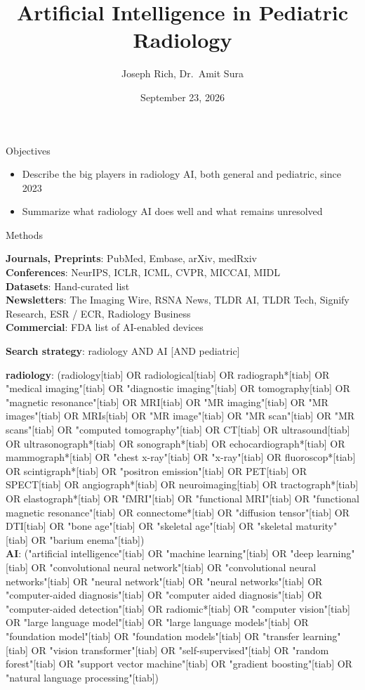 \documentclass[aspectratio=169]{beamer}
\title[Radiology AI]{Artificial Intelligence in Pediatric Radiology}
\author{Joseph Rich, Dr.~Amit Sura}
\date{September 23, 2026}
\begin{document}
\frame{\titlepage}

\begin{frame}{Objectives}
\begin{itemize}
  \item Describe the big players in radiology AI, both general and pediatric, since 2023
  \item Summarize what radiology AI does well and what remains unresolved
\end{itemize}
\end{frame}

\begin{frame}{Methods}
\vspace{-4pt}
{\small
\textbf{Journals, Preprints}: PubMed, Embase, arXiv, medRxiv\\
\textbf{Conferences}: NeurIPS, ICLR, ICML, CVPR, MICCAI, MIDL\\
\textbf{Datasets}: Hand-curated list\\
\textbf{Newsletters}: The Imaging Wire, RSNA News, TLDR AI, TLDR Tech, Signify Research, ESR / ECR, Radiology Business\\
\textbf{Commercial}: FDA list of AI-enabled devices\par}
\vspace{2pt}
{\small\textbf{Search strategy}: radiology AND AI [AND pediatric]\par}
\vspace{2pt}
{\tiny\fontsize{6}{7.3}\selectfont\raggedright
\textbf{radiology}: (radiology[tiab] OR radiological[tiab] OR radiograph*[tiab] OR "medical imaging"[tiab] OR "diagnostic imaging"[tiab] OR tomography[tiab] OR "magnetic resonance"[tiab] OR MRI[tiab] OR "MR imaging"[tiab] OR "MR images"[tiab] OR MRIs[tiab] OR "MR image"[tiab] OR "MR scan"[tiab] OR "MR scans"[tiab] OR "computed tomography"[tiab] OR CT[tiab] OR ultrasound[tiab] OR ultrasonograph*[tiab] OR sonograph*[tiab] OR echocardiograph*[tiab] OR mammograph*[tiab] OR "chest x-ray"[tiab] OR "x-ray"[tiab] OR fluoroscop*[tiab] OR scintigraph*[tiab] OR "positron emission"[tiab] OR PET[tiab] OR SPECT[tiab] OR angiograph*[tiab] OR neuroimaging[tiab] OR tractograph*[tiab] OR elastograph*[tiab] OR "fMRI"[tiab] OR "functional MRI"[tiab] OR "functional magnetic resonance"[tiab] OR connectome*[tiab] OR "diffusion tensor"[tiab] OR DTI[tiab] OR "bone age"[tiab] OR "skeletal age"[tiab] OR "skeletal maturity"[tiab] OR "barium enema"[tiab])\\[2pt]
\textbf{AI}: ("artificial intelligence"[tiab] OR "machine learning"[tiab] OR "deep learning"[tiab] OR "convolutional neural network"[tiab] OR "convolutional neural networks"[tiab] OR "neural network"[tiab] OR "neural networks"[tiab] OR "computer-aided diagnosis"[tiab] OR "computer aided diagnosis"[tiab] OR "computer-aided detection"[tiab] OR radiomic*[tiab] OR "computer vision"[tiab] OR "large language model"[tiab] OR "large language models"[tiab] OR "foundation model"[tiab] OR "foundation models"[tiab] OR "transfer learning"[tiab] OR "vision transformer"[tiab] OR "self-supervised"[tiab] OR "random forest"[tiab] OR "support vector machine"[tiab] OR "gradient boosting"[tiab] OR "natural language processing"[tiab])\\[2pt]
}
\end{frame}
\end{document}
